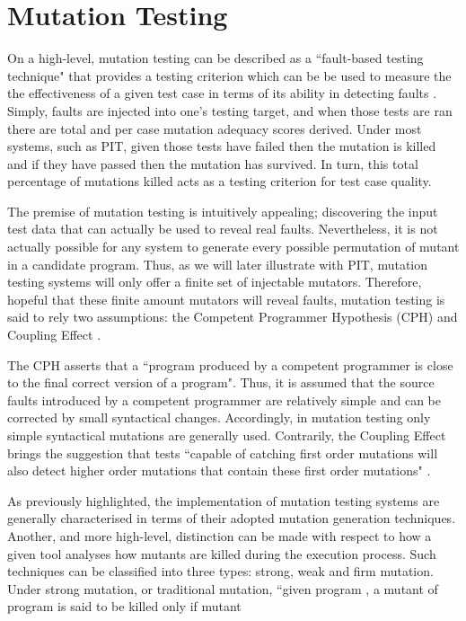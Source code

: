 \documentclass[a4paper]{article}
\begin{document}
\section{Mutation Testing}
On a high-level, mutation testing can be described as a ``fault-based testing technique" that provides a testing criterion which can be be used to measure the the effectiveness of a given test case in terms of its ability in detecting faults \citep{Jia}. Simply, faults are injected into one's testing target, and when those tests are ran there are total and per case mutation adequacy scores derived. Under most systems, such as PIT, given those tests have failed then the mutation is killed and if they have passed then the mutation has survived. In turn, this total percentage of mutations killed acts as a testing criterion for test case quality.
\par
The premise of mutation testing is intuitively appealing; discovering the input
test data that can actually be used to reveal real faults.
Nevertheless, it is not actually possible for any system to generate every possible permutation of mutant in a candidate program. 
Thus, as we will later illustrate with PIT, mutation testing systems will only offer a finite set of injectable mutators. Therefore, hopeful that these finite amount mutators will reveal faults, mutation testing is said to rely two assumptions: the Competent Programmer Hypothesis (CPH) and Coupling Effect \citep{Jia2}.
\par
The CPH asserts that a ``program produced by a competent programmer is close to the final correct version of a program". Thus, it
is assumed that the source faults introduced by a competent programmer
are relatively simple and can be corrected by small syntactical changes.
Accordingly, in mutation testing only simple syntactical mutations are generally
used. Contrarily, the Coupling Effect brings the suggestion that tests  ``capable of catching
first order mutations will also detect higher order mutations
that contain these first order mutations" \citep{Gopinath}.
\par
As previously highlighted, the implementation of mutation testing systems are generally characterised in terms of their adopted mutation generation techniques. Another, and more high-level, distinction can be made with respect to how a given tool analyses how mutants are killed during
the execution process. Such techniques can be classified into three types: strong, weak and firm mutation. Under strong mutation, or traditional mutation, ``given program , a mutant   of program   is said to be killed only if mutant  
\end{document}
